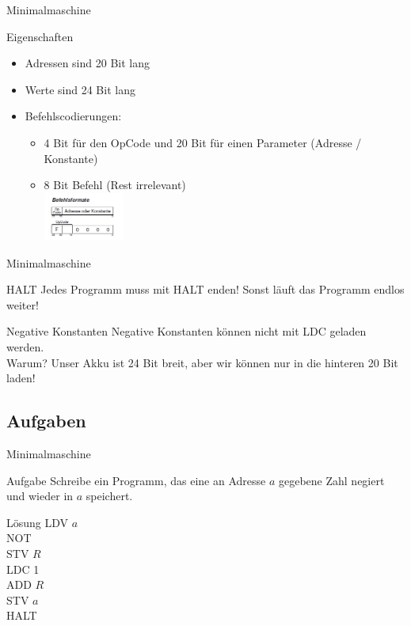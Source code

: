 \begin{frame}{Minimalmaschine}
	\begin{exampleblock}{Eigenschaften}
		\begin{itemize}
		\item Adressen sind 20 Bit lang
		\item Werte sind 24 Bit lang
		\item Befehlscodierungen:
		\begin{itemize}
			\item 4 Bit für den OpCode und 20 Bit für einen Parameter (Adresse / Konstante)
			\item 8 Bit Befehl (Rest irrelevant)\\
			\includegraphics[width=100px]{MIMA_commands.png}\\
		\end{itemize} 
	\end{itemize}
	\end{exampleblock}
\end{frame}

\begin{frame}{Minimalmaschine}
	\begin{alertblock}{HALT}
		Jedes Programm muss mit HALT enden! Sonst läuft das Programm endlos weiter!
	\end{alertblock}

	\begin{alertblock}{Negative Konstanten}
		Negative Konstanten können nicht mit LDC geladen werden.\\
		Warum? \pause Unser Akku ist 24 Bit breit, aber wir können nur in die hinteren 20 Bit laden!
	\end{alertblock}
\end{frame}

\subsection{Aufgaben}
\begin{frame}{Minimalmaschine}
	\begin{exampleblock}{Aufgabe}
		Schreibe ein Programm, das eine an Adresse $a$ gegebene Zahl negiert und wieder in $a$ speichert.
	\end{exampleblock}
	\pause
	\begin{block}{Lösung}
			LDV $a$\\
			NOT\\
			STV $R$\\
			LDC 1\\
			ADD $R$\\
			STV $a$\\
			HALT
		\end{block}
\end{frame}

